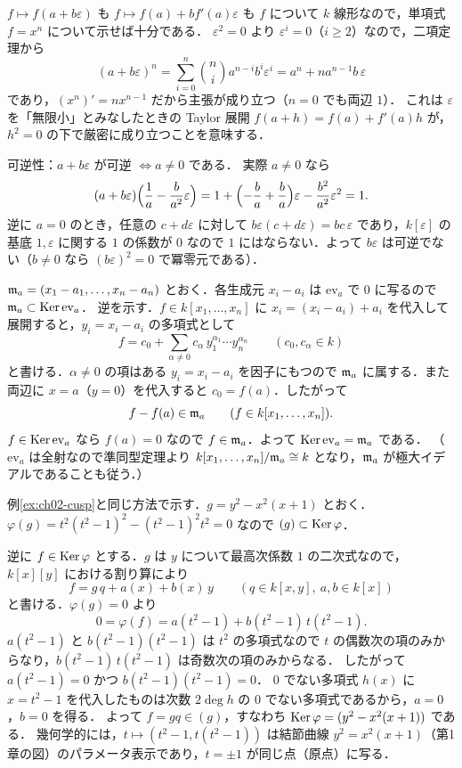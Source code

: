 $f\mapsto f(a+b\varepsilon)$ も $f\mapsto f(a)+bf'(a)\varepsilon$ も $f$ について $k$ 線形なので，単項式 $f=x^n$ について示せば十分である．
$\varepsilon^2=0$ より $\varepsilon^i=0$（$i\ge2$）なので，二項定理から
\[
  (a+b\varepsilon)^n=\sum_{i=0}^n\binom ni a^{n-i}b^i\varepsilon^i=a^n+na^{n-1}b\,\varepsilon
\]
であり，$(x^n)'=nx^{n-1}$ だから主張が成り立つ（$n=0$ でも両辺 $1$）．
これは $\varepsilon$ を「無限小」とみなしたときの Taylor 展開 $f(a+h)=f(a)+f'(a)h$ が，$h^2=0$ の下で厳密に成り立つことを意味する．

可逆性：$a+b\varepsilon$ が可逆 $\iff a\ne0$ である．
実際 $a\ne0$ なら
\[
  (a+b\varepsilon)\Bigl(\frac1a-\frac b{a^2}\varepsilon\Bigr)=1+\Bigl(-\frac ba+\frac ba\Bigr)\varepsilon-\frac{b^2}{a^2}\varepsilon^2=1.
\]
逆に $a=0$ のとき，任意の $c+d\varepsilon$ に対して $b\varepsilon(c+d\varepsilon)=bc\,\varepsilon$ であり，$k[\varepsilon]$ の基底 $1,\varepsilon$ に関する
$1$ の係数が $0$ なので $1$ にはならない．よって $b\varepsilon$ は可逆でない（$b\ne0$ なら $(b\varepsilon)^2=0$ で冪零元である）．

$\mathfrak{m}_a=(x_1-a_1,\dots,x_n-a_n)$ とおく．各生成元 $x_i-a_i$ は $\mathrm{ev}_a$ で $0$ に写るので $\mathfrak{m}_a\subset\operatorname{Ker}\mathrm{ev}_a$．
逆を示す．$f\in k[x_1,\dots,x_n]$ に $x_i=(x_i-a_i)+a_i$ を代入して展開すると，$y_i=x_i-a_i$ の多項式として
\[
  f=c_0+\sum_{\alpha\ne0}c_\alpha\,y_1^{\alpha_1}\cdots y_n^{\alpha_n}\qquad(c_0,c_\alpha\in k)
\]
と書ける．$\alpha\ne0$ の項はある $y_i=x_i-a_i$ を因子にもつので $\mathfrak{m}_a$ に属する．また両辺に $x=a$（$y=0$）を代入すると $c_0=f(a)$．したがって
\[
  f-f(a)\in\mathfrak{m}_a\qquad(f\in k[x_1,\dots,x_n]).
\]
$f\in\operatorname{Ker}\mathrm{ev}_a$ なら $f(a)=0$ なので $f\in\mathfrak{m}_a$．よって $\operatorname{Ker}\mathrm{ev}_a=\mathfrak{m}_a$ である．
（$\mathrm{ev}_a$ は全射なので準同型定理より $k[x_1,\dots,x_n]/\mathfrak{m}_a\cong k$ となり，$\mathfrak{m}_a$ が極大イデアルであることも従う．）

例\ref{ex:ch02-cusp}と同じ方法で示す．$g=y^2-x^2(x+1)$ とおく．
$\varphi(g)=t^2(t^2-1)^2-(t^2-1)^2t^2=0$ なので $(g)\subset\operatorname{Ker}\varphi$．

逆に $f\in\operatorname{Ker}\varphi$ とする．$g$ は $y$ について最高次係数 $1$ の二次式なので，$k[x][y]$ における割り算により
\[
  f=g\,q+a(x)+b(x)\,y\qquad(q\in k[x,y],\ a,b\in k[x])
\]
と書ける．$\varphi(g)=0$ より
\[
  0=\varphi(f)=a(t^2-1)+b(t^2-1)\,t(t^2-1).
\]
$a(t^2-1)$ と $b(t^2-1)(t^2-1)$ は $t^2$ の多項式なので $t$ の偶数次の項のみからなり，$b(t^2-1)\,t(t^2-1)$ は奇数次の項のみからなる．
したがって $a(t^2-1)=0$ かつ $b(t^2-1)(t^2-1)=0$．
$0$ でない多項式 $h(x)$ に $x=t^2-1$ を代入したものは次数 $2\deg h$ の $0$ でない多項式であるから，$a=0$，$b=0$ を得る．
よって $f=gq\in(g)$，すなわち $\operatorname{Ker}\varphi=(y^2-x^2(x+1))$ である．
幾何学的には，$t\mapsto(t^2-1,t(t^2-1))$ は結節曲線 $y^2=x^2(x+1)$（第1章の図）のパラメータ表示であり，$t=\pm1$ が同じ点（原点）に写る．

